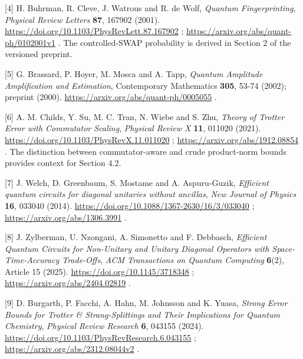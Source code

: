 \begin{samepage}
{[}4{]} H. Buhrman, R. Cleve, J. Watrous and R. de Wolf, \emph{Quantum
Fingerprinting}, \emph{Physical Review Letters} \textbf{87}, 167902
(2001). \url{https://doi.org/10.1103/PhysRevLett.87.167902} ;
\url{https://arxiv.org/abs/quant-ph/0102001v1} . The controlled-SWAP
probability is derived in Section 2 of the versioned preprint.
\end{samepage}

\begin{samepage}
{[}5{]} G. Brassard, P. Hoyer, M. Mosca and A. Tapp, \emph{Quantum
Amplitude Amplification and Estimation}, Contemporary Mathematics
\textbf{305}, 53-74 (2002); preprint (2000).
\url{https://arxiv.org/abs/quant-ph/0005055} .
\end{samepage}

\begin{samepage}
{[}6{]} A. M. Childs, Y. Su, M. C. Tran, N. Wiebe and S. Zhu,
\emph{Theory of Trotter Error with Commutator Scaling}, \emph{Physical
Review X} \textbf{11}, 011020 (2021).
\url{https://doi.org/10.1103/PhysRevX.11.011020} ;
\url{https://arxiv.org/abs/1912.08854} . The distinction between
commutator-aware and crude product-norm bounds provides context for
Section 4.2.
\end{samepage}

\begin{samepage}
{[}7{]} J. Welch, D. Greenbaum, S. Mostame and A. Aspuru-Guzik,
\emph{Efficient quantum circuits for diagonal unitaries without
ancillas}, \emph{New Journal of Physics} \textbf{16}, 033040 (2014).
\url{https://doi.org/10.1088/1367-2630/16/3/033040} ;
\url{https://arxiv.org/abs/1306.3991} .
\end{samepage}

\begin{samepage}
{[}8{]} J. Zylberman, U. Nzongani, A. Simonetto and F. Debbasch,
\emph{Efficient Quantum Circuits for Non-Unitary and Unitary Diagonal
Operators with Space-Time-Accuracy Trade-Offs}, \emph{ACM Transactions
on Quantum Computing} \textbf{6}(2), Article 15 (2025).
\url{https://doi.org/10.1145/3718348} ;
\url{https://arxiv.org/abs/2404.02819} .
\end{samepage}

\begin{samepage}
{[}9{]} D. Burgarth, P. Facchi, A. Hahn, M. Johnsson and K. Yuasa,
\emph{Strong Error Bounds for Trotter \& Strang-Splittings and Their
Implications for Quantum Chemistry}, \emph{Physical Review Research}
\textbf{6}, 043155 (2024).
\url{https://doi.org/10.1103/PhysRevResearch.6.043155} ;
\url{https://arxiv.org/abs/2312.08044v2} .
\end{samepage}

